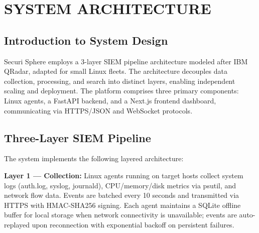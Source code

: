 \chapter{SYSTEM ARCHITECTURE}

\section{Introduction to System Design}

Securi Sphere employs a 3-layer SIEM pipeline architecture modeled after IBM QRadar, adapted for small Linux fleets. The architecture decouples data collection, processing, and search into distinct layers, enabling independent scaling and deployment. The platform comprises three primary components: Linux agents, a FastAPI backend, and a Next.js frontend dashboard, communicating via HTTPS/JSON and WebSocket protocols.

\section{Three-Layer SIEM Pipeline}

The system implements the following layered architecture:

\begin{center}
\end{center}

\noindent\textbf{Layer 1 — Collection:} Linux agents running on target hosts collect system logs (auth.log, syslog, journald), CPU/memory/disk metrics via psutil, and network flow data. Events are batched every 10 seconds and transmitted via HTTPS with HMAC-SHA256 signing. Each agent maintains a SQLite offline buffer for local storage when network connectivity is unavailable; events are auto-replayed upon reconnection with exponential backoff on persistent failures.

